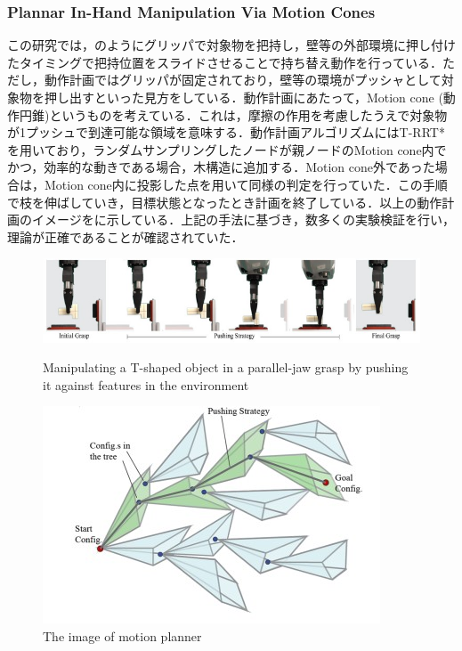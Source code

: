 \documentclass[a4paper,twoside,12pt,papersize, dvipdfmx]{iirthesis}
\begin{document}
\subsubsection{Plannar In-Hand Manipulation Via Motion Cones \cite{chavan-dafle2020}}
この研究では，のようにグリッパで対象物を把持し，壁等の外部環境に押し付けたタイミングで把持位置をスライドさせることで持ち替え動作を行っている．ただし，動作計画ではグリッパが固定されており，壁等の環境がプッシャとして対象物を押し出すといった見方をしている．動作計画にあたって，Motion cone (動作円錐)というものを考えている．これは，摩擦の作用を考慮したうえで対象物が1プッシュで到達可能な領域を意味する．動作計画アルゴリズムにはT-RRT*を用いており，ランダムサンプリングしたノードが親ノードのMotion cone内でかつ，効率的な動きである場合，木構造に追加する．Motion cone外であった場合は，Motion cone内に投影した点を用いて同様の判定を行っていた．この手順で枝を伸ばしていき，目標状態となったとき計画を終了している．以上の動作計画のイメージをに示している．上記の手法に基づき，数多くの実験検証を行い，理論が正確であることが確認されていた．
\begin{figure}
\begin{minipage}{0.49\hsize}
\centering
\includegraphics[width=0.9\hsize]{fig/1-introduction/chavan-dafle/manipulation.jpg}
\caption{Manipulating a T-shaped object in a parallel-jaw grasp by pushing it against features in the environment \cite{chavan-dafle2020}}
\label{fig::maniT}
\end{minipage} \hfill
\begin{minipage}{0.49\hsize}
\centering
\includegraphics[width=0.8\hsize]{fig/1-introduction/chavan-dafle/rrtimage.jpg}
\caption{The image of motion planner \cite{chavan-dafle2020}}
\label{fig::rrtimage}
\end{minipage}
\end{figure}
\end{document}
